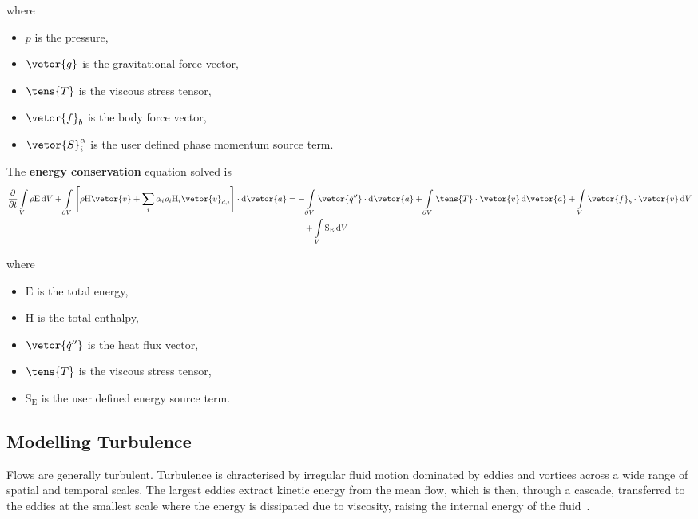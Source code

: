 \noindent where
\begin{itemize}[topsep=0pt, labelindent=40pt,labelsep=5pt, parsep = 2pt, listparindent=2em]
\item $p$ is the pressure,
\item $\vetor{g}$ is the gravitational force vector,
\item $\tens{T}$ is the viscous stress tensor,
\item $\vetor{f}_{b}$ is the body force vector,
\item $\vetor{S}^{\alpha}_{i}$ is the user defined phase momentum source term.
\end{itemize}


The \textbf{energy conservation} equation solved is
\begin{equation}\label{eq_vof_energy}
\begin{split}
\frac{\partial}{\partial t}\int\limits_{V}\rho \mathrm{E}\,\mathrm{d}V +
\int\limits_{\partial V} \left[\rho \mathrm{H} \vetor{v} + \sum_{i}\alpha_{i} \rho_{i} \mathrm{H}_{i} \vetor{v}_{d,i}\right] \cdot \mathrm{d}\vetor{a}
&= - \int\limits_{\partial V} \vetor{\dot{q}''}  \cdot \mathrm{d}\vetor{a} + \int\limits_{\partial V} \tens{T}\cdot\vetor{v}\,\mathrm{d}\vetor{a}
 + \int\limits_{V}\vetor{f}_{b}\cdot\vetor{v}\,\mathrm{d}V\\
&\qquad{} + \int\limits_{V} \mathrm{S}_{\mathrm{E}}\,\mathrm{d}V
\end{split}
\end{equation}

\noindent where
\begin{itemize}[topsep=0pt, labelindent=40pt,labelsep=5pt, parsep = 2pt, listparindent=2em]
\item $\mathrm{E}$ is the total energy,
\item $\mathrm{H}$ is the total enthalpy,
\item $\vetor{\dot{q}''}$ is the heat flux vector,
\item $\tens{T}$ is the viscous stress tensor,
\item $\mathrm{S}_{\mathrm{E}}$ is the user defined energy source term.
\end{itemize}
\subsection{Modelling Turbulence}
Flows are generally turbulent. Turbulence is chracterised by irregular fluid motion dominated by
 eddies and vortices across a wide range of spatial and temporal scales. The largest eddies
 extract kinetic energy from the mean flow, which is then, through a cascade, transferred
 to the eddies at
 the smallest scale where the energy is dissipated due to viscosity, raising the 
 internal energy of the fluid~\cite{gilmanDevelopmentGeneralPurpose2014, davidsonIntroductionTurbulenceModels}.

